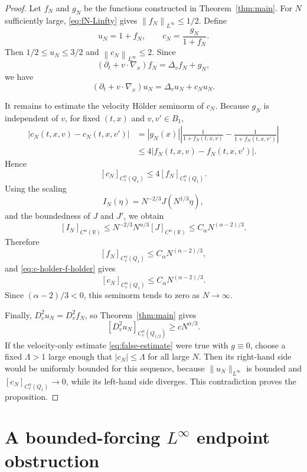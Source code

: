 \documentclass[11pt,reqno]{amsart}
\numberwithin{equation}{section}
\theoremstyle{remark}
\newcommand{\norm}[1]{\left\|#1\right\|}
\begin{document}
\begin{proof}
Let $f_N$ and $g_N$ be the functions constructed in Theorem~\ref{thm:main}.  For $N$ sufficiently large, \eqref{eq:fN-Linfty} gives $\norm{f_N}_{L^\infty}\le1/2$.  Define
\[
   u_N=1+f_N,
   \qquad
   c_N=\frac{g_N}{1+f_N}.
\]
Then $1/2\le u_N\le3/2$ and $\norm{c_N}_{L^\infty}\le2$.  Since
\[
   (\partial_t+v\cdot\nabla_x)f_N=\Delta_vf_N+g_N,
\]
we have
\[
   (\partial_t+v\cdot\nabla_x)u_N=\Delta_vu_N+c_Nu_N.
\]

It remains to estimate the velocity H\"older seminorm of \(c_N\).
Because \(g_N\) is independent of \(v\), for fixed \((t,x)\) and
\(v,v'\in B_1\),
\[
\begin{aligned}
   |c_N(t,x,v)-c_N(t,x,v')|
   &= |g_N(x)|
      \left|
      \frac1{1+f_N(t,x,v)}
      -
      \frac1{1+f_N(t,x,v')}
      \right|  \\
   &\le 4|f_N(t,x,v)-f_N(t,x,v')|.
\end{aligned}
\]
Hence
\begin{equation}\label{eq:c-holder-f-holder}
   [c_N]_{C_v^\alpha(Q_1)}
   \le 4[f_N]_{C_v^\alpha(Q_1)}.
\end{equation}
Using the scaling
\[
   I_N(\eta)=N^{-2/3}J(N^{1/3}\eta),
\]
and the boundedness of \(J\) and \(J'\), we obtain
\[
   [I_N]_{C^\alpha(\mathbb R)}
   \le N^{-2/3}N^{\alpha/3}[J]_{C^\alpha(\mathbb R)}
   \le C_\alpha N^{(\alpha-2)/3}.
\]
Therefore
\[
   [f_N]_{C_v^\alpha(Q_1)}
   \le C_\alpha N^{(\alpha-2)/3},
\]
and \eqref{eq:c-holder-f-holder} gives
\[
   [c_N]_{C_v^\alpha(Q_1)}
   \le C_\alpha N^{(\alpha-2)/3}.
\]
Since \((\alpha-2)/3<0\), this seminorm tends to zero as \(N\to\infty\).

Finally, $D_v^2u_N=D_v^2f_N$, so Theorem~\ref{thm:main} gives
\[
   [D_v^2u_N]_{C_v^\alpha(Q_{1/2})}\ge cN^{\alpha/3}.
\]
If the velocity-only estimate \eqref{eq:false-estimate} were true with $g\equiv0$, choose a fixed $\Lambda>1$ large enough that $|c_N|\le\Lambda$ for all large $N$.  Then its right-hand side would be uniformly bounded for this sequence, because $\|u_N\|_{L^\infty}$ is bounded and $[c_N]_{C_v^\alpha(Q_1)}\to0$, while its left-hand side diverges.  This contradiction proves the proposition.
\end{proof}


\section{A bounded-forcing \texorpdfstring{$L^\infty$}{L-infinity} endpoint obstruction}\label{sec:Linfty-endpoint}
\end{document}
